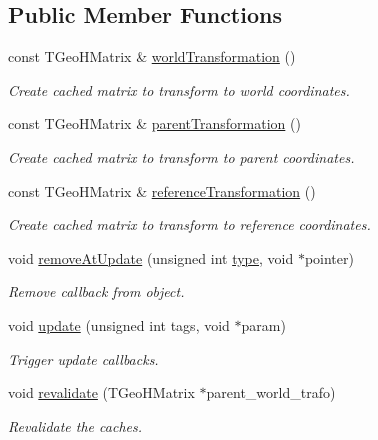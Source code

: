 \subsection*{Public Member Functions}
\begin{DoxyCompactItemize}
\item 
const T\+Geo\+H\+Matrix \& \hyperlink{class_d_d4hep_1_1_geometry_1_1_det_element_object_acb5621525dd6d99d263424e298a4002b}{world\+Transformation} ()
\begin{DoxyCompactList}\small\item\em Create cached matrix to transform to world coordinates. \end{DoxyCompactList}\item 
const T\+Geo\+H\+Matrix \& \hyperlink{class_d_d4hep_1_1_geometry_1_1_det_element_object_a9db522499c3fbe2f11ae195cfd4f5e03}{parent\+Transformation} ()
\begin{DoxyCompactList}\small\item\em Create cached matrix to transform to parent coordinates. \end{DoxyCompactList}\item 
const T\+Geo\+H\+Matrix \& \hyperlink{class_d_d4hep_1_1_geometry_1_1_det_element_object_a728e600b6e565f6fb2174e36422ef1bc}{reference\+Transformation} ()
\begin{DoxyCompactList}\small\item\em Create cached matrix to transform to reference coordinates. \end{DoxyCompactList}\item 
void \hyperlink{class_d_d4hep_1_1_geometry_1_1_det_element_object_ad0d107dfcc7629eb1009cde63e24981b}{remove\+At\+Update} (unsigned int \hyperlink{class_d_d4hep_1_1_named_object_a8e17bb5f854b320302be44c68c39a192}{type}, void $\ast$pointer)
\begin{DoxyCompactList}\small\item\em Remove callback from object. \end{DoxyCompactList}\item 
void \hyperlink{class_d_d4hep_1_1_geometry_1_1_det_element_object_a826e6ef5e3869b55970bd7c74f57b3a1}{update} (unsigned int tags, void $\ast$param)
\begin{DoxyCompactList}\small\item\em Trigger update callbacks. \end{DoxyCompactList}\item 
void \hyperlink{class_d_d4hep_1_1_geometry_1_1_det_element_object_a30a0085da8a1ef8d1253b37e494df066}{revalidate} (T\+Geo\+H\+Matrix $\ast$parent\+\_\+world\+\_\+trafo)
\begin{DoxyCompactList}\small\item\em Revalidate the caches. \end{DoxyCompactList}\end{DoxyCompactItemize}
